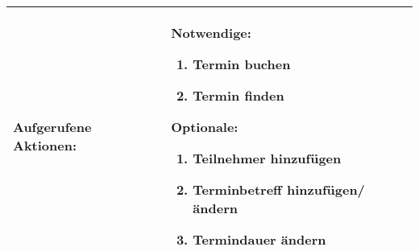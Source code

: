 \begin{tabularx}{\textwidth}{|X|X|}
    \hline
    Aufgerufene Aktionen: & Notwendige: \begin{enumerate}
                                        \item Termin buchen
                                        \item Termin finden
                                            \end{enumerate}
            \linebreak Optionale: \begin{enumerate}
                                      \item Teilnehmer hinzufügen
                                      \item Terminbetreff hinzufügen/ändern
                                        \item Termindauer ändern
                                      \end{enumerate}\\
    \hline
\end{tabularx}
\normalsize
\pagebreak